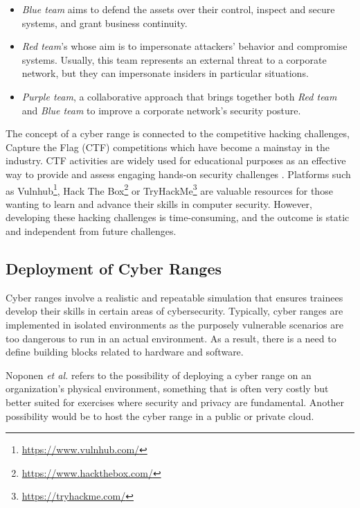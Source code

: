 \begin{itemize}
    \item \textit{Blue team} aims to defend the assets over their control, inspect and secure systems, and grant business continuity.
    \item \textit{Red team}'s whose aim is to impersonate attackers' behavior and compromise systems. Usually, this team represents an external threat to a corporate network, but they can impersonate insiders in particular situations.
    \item \textit{Purple team}, a collaborative approach that brings together both \textit{Red team} and \textit{Blue team} to improve a corporate network's security posture.
\end{itemize}

The concept of a cyber range is connected to the competitive hacking challenges, Capture the Flag (CTF) competitions which have become a mainstay in the industry. CTF activities are widely used for educational purposes as an effective way to provide and assess engaging hands-on security challenges \cite{secgen_ref}. Platforms such as Vulnhub\footnote{\url{https://www.vulnhub.com/}}, Hack The Box\footnote{\url{https://www.hackthebox.com/}} or TryHackMe\footnote{\url{https://tryhackme.com/}} are valuable resources for those wanting to learn and advance their skills in computer security. However, developing these hacking challenges is time-consuming, and the outcome is static and independent from future challenges.

\subsection{Deployment of Cyber Ranges} \label{sec:features_cr}

Cyber ranges involve a realistic and repeatable simulation that ensures trainees develop their skills in certain areas of cybersecurity. Typically, cyber ranges are implemented in isolated environments as the purposely vulnerable scenarios are too dangerous to run in an actual environment. As a result, there is a need to define building blocks related to hardware and software.

Noponen \textit{et al.} \cite{cybersecurity_threat_and_mitigations_ref} refers to the possibility of deploying a cyber range on an organization's physical environment, something that is often very costly but better suited for exercises where security and privacy are fundamental. Another possibility would be to host the cyber range in a public or private cloud. 


